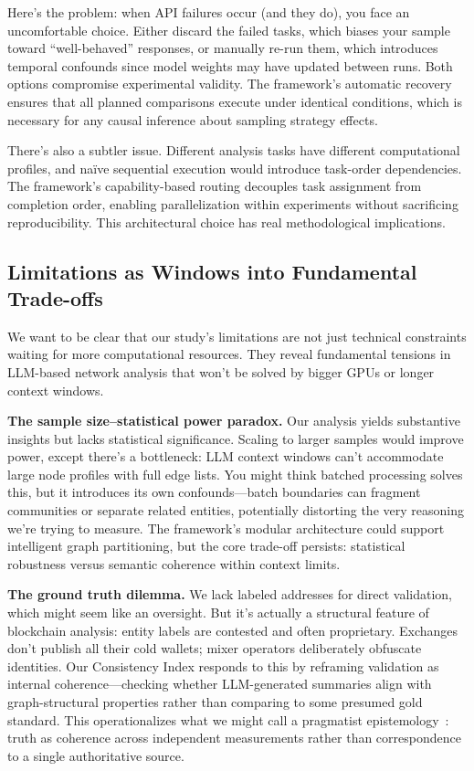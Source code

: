Here's the problem: when API failures occur (and they do), you face an uncomfortable choice. Either discard the failed tasks, which biases your sample toward ``well-behaved'' responses, or manually re-run them, which introduces temporal confounds since model weights may have updated between runs. Both options compromise experimental validity. The framework's automatic recovery ensures that all planned comparisons execute under identical conditions, which is necessary for any causal inference about sampling strategy effects.

There's also a subtler issue. Different analysis tasks have different computational profiles, and naïve sequential execution would introduce task-order dependencies. The framework's capability-based routing decouples task assignment from completion order, enabling parallelization within experiments without sacrificing reproducibility. This architectural choice has real methodological implications.

\subsection{Limitations as Windows into Fundamental Trade-offs}

We want to be clear that our study's limitations are not just technical constraints waiting for more computational resources. They reveal fundamental tensions in LLM-based network analysis that won't be solved by bigger GPUs or longer context windows.

\textbf{The sample size--statistical power paradox.} Our analysis yields substantive insights but lacks statistical significance. Scaling to larger samples would improve power, except there's a bottleneck: LLM context windows can't accommodate large node profiles with full edge lists. You might think batched processing solves this, but it introduces its own confounds---batch boundaries can fragment communities or separate related entities, potentially distorting the very reasoning we're trying to measure. The framework's modular architecture could support intelligent graph partitioning, but the core trade-off persists: statistical robustness versus semantic coherence within context limits.

\textbf{The ground truth dilemma.} We lack labeled addresses for direct validation, which might seem like an oversight. But it's actually a structural feature of blockchain analysis: entity labels are contested and often proprietary. Exchanges don't publish all their cold wallets; mixer operators deliberately obfuscate identities. Our Consistency Index responds to this by reframing validation as internal coherence---checking whether LLM-generated summaries align with graph-structural properties rather than comparing to some presumed gold standard. This operationalizes what we might call a pragmatist epistemology~\cite{dewey1938logic}: truth as coherence across independent measurements rather than correspondence to a single authoritative source.

